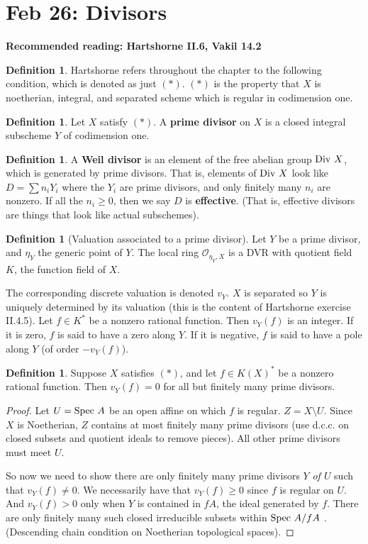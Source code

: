 \documentclass[10pt,reqno]{amsart}
\theoremstyle{definition}
\newtheorem{definition}[theorem]{Definition}
\theoremstyle{remark}
\numberwithin{equation}{section}
\numberwithin{theorem}{section}
\newcommand{\OO}{{\mathcal O}}
\newcommand{\spec}{\textup{Spec }}
\newcommand{\Div}{\textup{Div }}
\begin{document}
\section{Feb 26: Divisors}
\textbf{Recommended reading: Hartshorne II.6, Vakil 14.2}

\begin{definition} Hartshorne refers throughout the chapter to the following condition, which is denoted as just $(\ast)$. $(\ast)$ is the property that $X$ is noetherian, integral, and separated scheme which is regular in codimension one.
\end{definition}

\begin{definition}
Let $X$ satisfy $(\ast)$. A \textbf{prime divisor} on $X$ is a closed integral subscheme $Y$ of codimension one. 
\end{definition}

\begin{definition}A \textbf{Weil divisor} is an element of the free abelian group $\Div X$, which is generated by prime divisors. That is, elements of $\Div X$ look like $D = \sum n_i Y_i$ where the $Y_i$ are prime divisors, and only finitely many $n_i$ are nonzero. If all the $n_i \ge 0$, then we say $D$ is \textbf{effective}. (That is, effective divisors are things that look like actual subschemes).
\end{definition}

\begin{definition}[Valuation associated to a prime divisor] Let $Y$ be a prime divisor, and $\eta_Y$ the generic point of $Y$. The local ring $\OO_{\eta_Y, X}$ is a DVR with quotient field $K$, the function field of $X$. 

The corresponding discrete valuation is denoted $v_Y$. $X$ is separated so $Y$ is uniquely determined by its valuation (this is the content of Hartshorne exercise II.4.5). Let $f \in K^*$ be a nonzero rational function. Then $v_Y(f)$ is an integer. If it is zero, $f$ is said to have a zero along $Y$. If it is negative, $f$ is said to have a pole along $Y$ (of order $-v_Y(f)$).
\end{definition}

\begin{definition} Suppose $X$ satisfies $(\ast)$, and let $f \in K(X)^*$ be a nonzero rational function. Then $v_Y(f) = 0$ for all but finitely many prime divisors.
\end{definition}
\begin{proof}
Let $U = \spec A$ be an open affine on which $f$ is regular. $Z = X \setminus U$. Since $X$ is Noetherian, $Z$ contains at most finitely many prime divisors (use d.c.c. on closed subsets and quotient ideals to remove pieces). All other prime divisors must meet $U$.

So now we need to show there are only finitely many prime divisors $Y$ \textit{of $U$} such that $v_Y(f) \ne 0$. We necessarily have that $v_Y(f) \ge 0$ since $f$ is regular on $U$. And $v_Y(f) > 0$ only when $Y$ is contained in $fA$, the ideal generated by $f$. There are only finitely many such closed irreducible subsets within $\spec A/fA$ . (Descending chain condition on Noetherian topological spaces).
\end{proof}
\end{document}
